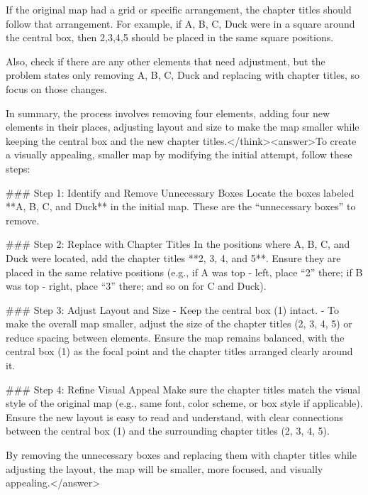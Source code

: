 If the original map had a grid or specific arrangement, the chapter titles should follow that arrangement. For example, if A, B, C, Duck were in a square around the central box, then 2,3,4,5 should be placed in the same square positions.

Also, check if there are any other elements that need adjustment, but the problem states only removing A, B, C, Duck and replacing with chapter titles, so focus on those changes.

In summary, the process involves removing four elements, adding four new elements in their places, adjusting layout and size to make the map smaller while keeping the central box and the new chapter titles.</think><answer>To create a visually appealing, smaller map by modifying the initial attempt, follow these steps:  

### Step 1: Identify and Remove Unnecessary Boxes  
Locate the boxes labeled **A, B, C, and Duck** in the initial map. These are the “unnecessary boxes” to remove.  

### Step 2: Replace with Chapter Titles  
In the positions where A, B, C, and Duck were located, add the chapter titles **2, 3, 4, and 5**. Ensure they are placed in the same relative positions (e.g., if A was top - left, place “2” there; if B was top - right, place “3” there; and so on for C and Duck).  

### Step 3: Adjust Layout and Size  
- Keep the central box (1) intact.  
- To make the overall map smaller, adjust the size of the chapter titles (2, 3, 4, 5) or reduce spacing between elements. Ensure the map remains balanced, with the central box (1) as the focal point and the chapter titles arranged clearly around it.  

### Step 4: Refine Visual Appeal  
Make sure the chapter titles match the visual style of the original map (e.g., same font, color scheme, or box style if applicable). Ensure the new layout is easy to read and understand, with clear connections between the central box (1) and the surrounding chapter titles (2, 3, 4, 5).  


By removing the unnecessary boxes and replacing them with chapter titles while adjusting the layout, the map will be smaller, more focused, and visually appealing.</answer>